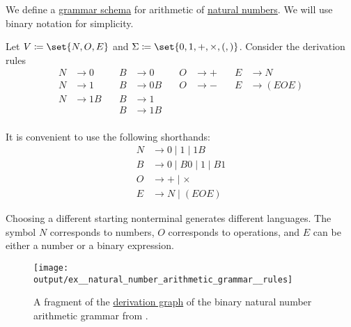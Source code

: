 \begin{example}\label{ex:natural_number_arithmetic_grammar/schema}
  We define a \hyperref[def:formal_grammar/schema]{grammar schema} for arithmetic of \hyperref[def:natural_numbers]{natural numbers}. We will use binary notation for simplicity.

  Let \( V \coloneqq \set{ N, O, E } \) and \( \Sigma \coloneqq \set{ 0, 1, +, \times, (, ) } \). Consider the derivation rules
  \begin{equation}\label{eq:ex:natural_number_arithmetic_grammar/schema/simple}
    \begin{aligned}
      N &\to 0   & \quad B &\to 0   & \quad O &\to +      & \quad E &\to N \\
      N &\to 1   & \quad B &\to 0 B & \quad O &\to -      & \quad E &\to (E O E) \\
      N &\to 1 B & \quad B &\to 1   & \quad   &           &         & \\
        &        & \quad B &\to 1 B & \quad   &           &         & \\
    \end{aligned}
  \end{equation}

  It is convenient to use the following shorthands:
  \begin{equation}\label{eq:ex:natural_number_arithmetic_grammar/schema/shorthand}
    \begin{aligned}
      N &\to 0 \mid 1 \mid 1 B \\
      B &\to 0 \mid B 0 \mid 1 \mid B 1 \\
      O &\to + \mid \times \\
      E &\to N \mid (E O E)
    \end{aligned}
  \end{equation}

  Choosing a different starting nonterminal generates different languages. The symbol \( N \) corresponds to numbers, \( O \) corresponds to operations, and \( E \) can be either a number or a binary expression.

  \begin{figure}[!ht]
    \centering
    \texttt{[image: output/ex\_\_natural\_number\_arithmetic\_grammar\_\_rules]}
    \caption{A fragment of the \hyperref[def:formal_grammar/graph]{derivation graph} of the binary natural number arithmetic grammar from .}
    \label{fig:ex:natural_number_arithmetic_grammar/schema}
  \end{figure}
\end{example}

